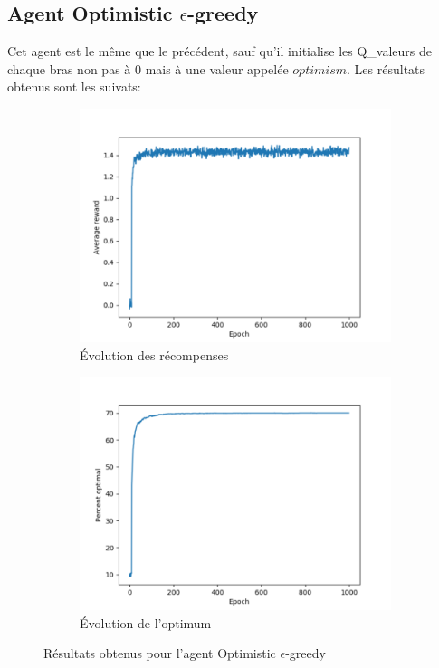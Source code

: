 \documentclass[a4paper,english,12pt]{article}
\begin{document}
\subsection{Agent Optimistic $\epsilon$-greedy}
Cet agent est le même que le précédent, sauf qu'il initialise les Q\_valeurs de chaque bras non pas à 0 mais à une valeur appelée $optimism$. Les résultats obtenus sont les suivats:

\begin{figure}[H]
	\centering
	\begin{subfigure}{0.48\textwidth}
		\includegraphics[width=\textwidth]{opt_reward}
		\caption{Évolution des récompenses}
	\end{subfigure}
	\begin{subfigure}{0.48\textwidth}
		\includegraphics[width=\textwidth]{opt_optimal}
		\caption{Évolution de l'optimum}
	\end{subfigure}
	\caption{Résultats obtenus pour l'agent Optimistic $\epsilon$-greedy}
\end{figure}
\end{document}
